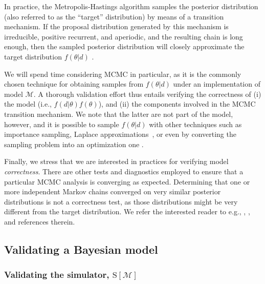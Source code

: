 \documentclass[oneside]{article}
\begin{document}
In practice, the Metropolis-Hastings algorithm samples the posterior
distribution (also referred to as the ``target'' distribution) by means of a
transition mechanism. 
If the proposal distribution generated by this mechanism is irreducible, positive recurrent, and aperiodic, and the resulting chain is long enough, then the sampled posterior distribution will closely approximate the target distribution $f(\theta|d)$ \citep{smith93,tierney94,gelman}.

We will spend time considering MCMC in particular, as it is the commonly chosen technique for obtaining samples from $f(\theta|d)$ under an implementation of model $\mathcal{M}$.
A thorough validation effort thus entails verifying the correctness of (i) the model (i.e., $f(d|\theta)f(\theta)$), and (ii) the components involved in the MCMC transition mechanism.
We note that the latter are not part of the model, however, and it is  possible to sample $f(\theta|d)$ with other techniques such as importance sampling, Laplace approximations~\citep{inla}, or even by converting the sampling problem into an optimization one \citep[e.g.,][]{zhang18}.

Finally, we stress that we are interested in practices for verifying model
\emph{correctness}.
There are other tests and diagnostics employed to ensure that a particular MCMC analysis is converging as expected.
Determining that one or more independent Markov chains converged on very similar posterior distributions is not a correctness test, as those distributions might be very different from the target distribution. 
We refer the interested reader to e.g., \cite{rwty}, \cite{fabreti2022}, 
\cite{magee2023} and references therein.

\subsection*{Validating a Bayesian model}

\subsubsection*{Validating the simulator, $\text{S}[\mathcal{M}]$}
\label{verify-correctness-of-simulator-implementation}
\end{document}
